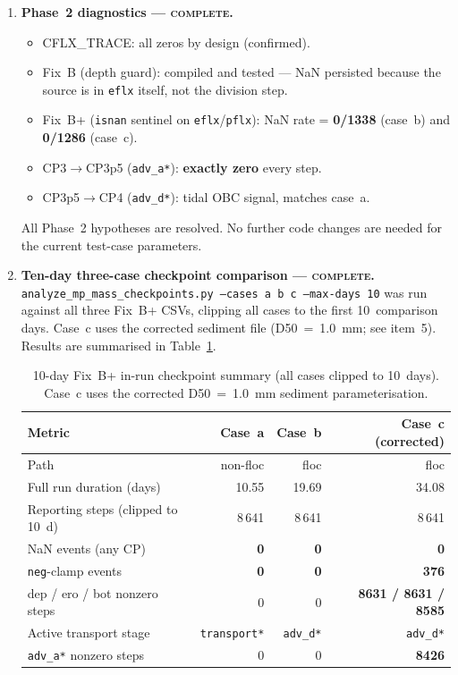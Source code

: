 \documentclass[11pt]{article}
\begin{document}
\begin{enumerate}

\item \textbf{Phase~2 diagnostics --- \textsc{complete}.}
\begin{itemize}
  \item CFLX\_TRACE: all zeros by design (confirmed). \checkmark
  \item Fix~B (depth guard): compiled and tested --- NaN persisted because
        the source is in \texttt{eflx} itself, not the division step.
  \item Fix~B+ (\texttt{isnan} sentinel on \texttt{eflx}/\texttt{pflx}):
        NaN rate = \textbf{0/1338} (case~b) and \textbf{0/1286} (case~c). \checkmark
  \item CP3$\to$CP3p5 (\texttt{adv\_a*}): \textbf{exactly zero} every step. \checkmark
  \item CP3p5$\to$CP4 (\texttt{adv\_d*}): tidal OBC signal, matches case~a. \checkmark
\end{itemize}
All Phase~2 hypotheses are resolved.  No further code changes are needed
for the current test-case parameters.

\item \textbf{Ten-day three-case checkpoint comparison --- \textsc{complete}.} \checkmark
\texttt{analyze\_mp\_mass\_checkpoints.py --cases a b c --max-days 10} was run
against all three Fix~B+ CSVs, clipping all cases to the first 10~comparison days.
Case~c uses the corrected sediment file (D50~=~1.0~mm; see item~5).
Results are summarised in Table~\ref{tab:20day}.

\begin{table}[h]
\centering
\caption{10-day Fix~B+ in-run checkpoint summary (all cases clipped to 10~days).
         Case~c uses the corrected D50~=~1.0~mm sediment parameterisation.}
\label{tab:20day}
\small
\begin{tabular}{lrrr}
\toprule
Metric & Case~a & Case~b & Case~c (corrected) \\
\midrule
Path & non-floc & floc & floc \\
Full run duration (days) & 10.55 & 19.69 & 34.08 \\
Reporting steps (clipped to 10~d) & 8\,641 & 8\,641 & 8\,641 \\
NaN events (any CP) & \textbf{0} & \textbf{0} & \textbf{0} \\
\texttt{neg}-clamp events & \textbf{0} & \textbf{0} & \textbf{376} \\
dep / ero / bot nonzero steps & 0 & 0 & \textbf{8631 / 8631 / 8585} \\
Active transport stage & \texttt{transport*} & \texttt{adv\_d*} & \texttt{adv\_d*} \\
\texttt{adv\_a*} nonzero steps & 0 & 0 & \textbf{8426} \\
\bottomrule
\end{tabular}
\end{table}


\end{enumerate}
\end{document}
